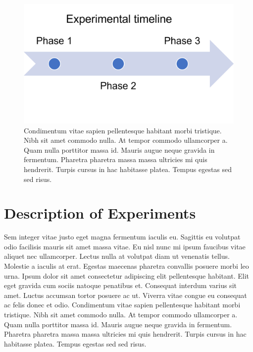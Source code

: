 \documentclass[
]{article}
\begin{document}
\begin{figure}

{\centering \includegraphics[width=21.69in]{../../figures/experimental_timeline} 

}

\caption{Condimentum vitae sapien pellentesque habitant morbi tristique. Nibh sit amet commodo nulla. At tempor commodo ullamcorper a. Quam nulla porttitor massa id. Mauris augue neque gravida in fermentum. Pharetra pharetra massa massa ultricies mi quis hendrerit. Turpis cursus in hac habitasse platea. Tempus egestas sed sed risus.}\label{fig:experimental-design}
\end{figure}



\hypertarget{description-of-experiments}{%
\section{Description of Experiments}\label{description-of-experiments}}

Sem integer vitae justo eget magna fermentum iaculis eu. Sagittis eu volutpat odio facilisis mauris sit amet massa vitae. Eu nisl nunc mi ipsum faucibus vitae aliquet nec ullamcorper. Lectus nulla at volutpat diam ut venenatis tellus. Molestie a iaculis at erat. Egestas maecenas pharetra convallis posuere morbi leo urna. Ipsum dolor sit amet consectetur adipiscing elit pellentesque habitant. Elit eget gravida cum sociis natoque penatibus et. Consequat interdum varius sit amet. Luctus accumsan tortor posuere ac ut. Viverra vitae congue eu consequat ac felis donec et odio. Condimentum vitae sapien pellentesque habitant morbi tristique. Nibh sit amet commodo nulla. At tempor commodo ullamcorper a. Quam nulla porttitor massa id. Mauris augue neque gravida in fermentum. Pharetra pharetra massa massa ultricies mi quis hendrerit. Turpis cursus in hac habitasse platea. Tempus egestas sed sed risus.
\end{document}
